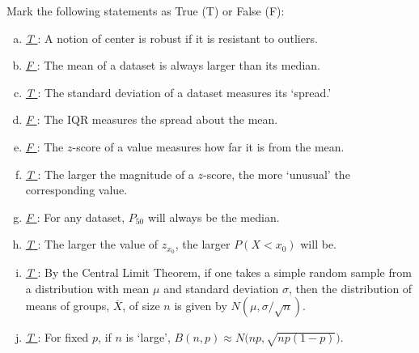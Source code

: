 \documentclass[12pt,letterpaper]{exam}
\begin{document}
\examtitle
{} 
\scores
\newpage

\begin{questions}

\newpage
\question[10] Mark the following statements as True (T) or False (F): \pspace

\newcommand{\myTrue}{\hspace{0.505cm} \textit{T} \hspace{0.505cm}}
\newcommand{\myFalse}{\hspace{0.505cm} \textit{F} \hspace{0.505cm}}

\begin{enumerate}[(a)]
\item \underline{\myTrue}: A notion of center is robust if it is resistant to outliers. \vfill
\item \underline{\myFalse}: The mean of a dataset is always larger than its median. \vfill
\item \underline{\myTrue}: The standard deviation of a dataset measures its `spread.' \vfill
\item \underline{\myFalse}: The IQR measures the spread about the mean. \vfill
\item \underline{\myFalse}: The $z$-score of a value measures how far it is from the mean. \vfill
\item \underline{\myTrue}: The larger the magnitude of a $z$-score, the more `unusual' the corresponding value. \vfill
\item \underline{\myFalse}: For any dataset, $P_{50}$ will always be the median. \vfill
\item \underline{\myTrue}: The larger the value of $z_{x_0}$, the larger $P(X < x_0)$ will be. \vfill
\item \underline{\myTrue}: By the Central Limit Theorem, if one takes a simple random sample from a distribution with mean $\mu$ and standard deviation $\sigma$, then the distribution of means of groups, $\overline{X}$, of size $n$ is given by $N(\mu, \sigma/\sqrt{n})$. \vfill
\item \underline{\myTrue}: For fixed $p$, if $n$ is `large', $B(n, p) \approx N\big(np, \sqrt{np(1 - p)} \big)$. \vfill
\end{enumerate}




\end{questions}
\end{document}
